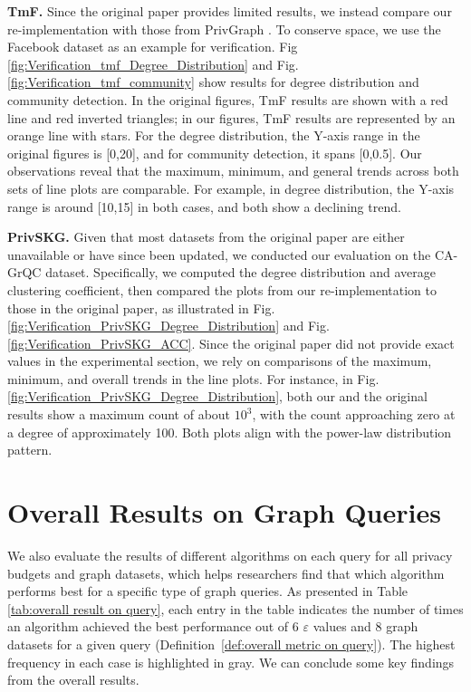 \documentclass[conference]{IEEEtran}
\theoremstyle{plain}
\begin{document}
\textbf{TmF.} 
Since the original paper \cite{nguyen2015differentially} provides limited results, we instead compare our re-implementation with those from PrivGraph \cite{yuan2023privgraph}. 
To conserve space, we use the Facebook dataset as an example for verification. 
Fig \ref{fig:Verification_tmf_Degree_Distribution} and Fig. \ref{fig:Verification_tmf_community} show results for degree distribution and community detection. 
In the original figures, TmF results are shown with a red line and red inverted triangles; in our figures, TmF results are represented by an orange line with stars.
For the degree distribution, the Y-axis range in the original figures is [0,20], and for community detection, it spans [0,0.5]. 
Our observations reveal that the maximum, minimum, and general trends across both sets of line plots are comparable. 
For example, in degree distribution, the Y-axis range is around [10,15] in both cases, and both show a declining trend.

\textbf{PrivSKG.} 
Given that most datasets from the original paper are either unavailable or have since been updated, we conducted our evaluation on the CA-GrQC dataset. 
Specifically, we computed the degree distribution and average clustering coefficient, then compared the plots from our re-implementation to those in the original paper, as illustrated in Fig. \ref{fig:Verification_PrivSKG_Degree_Distribution} and Fig. \ref{fig:Verification_PrivSKG_ACC}.
Since the original paper did not provide exact values in the experimental section, we rely on comparisons of the maximum, minimum, and overall trends in the line plots. 
For instance, in Fig. \ref{fig:Verification_PrivSKG_Degree_Distribution}, both our and the original results show a maximum count of about $10^3$, with the count approaching zero at a degree of approximately 100. 
Both plots align with the power-law distribution pattern.


\section{Overall Results on Graph Queries}

We also evaluate the results of different algorithms on each query for all privacy budgets and graph datasets, which helps researchers find that which algorithm performs best for a specific type of graph queries.
As presented in Table \ref{tab:overall result on query}, each entry in the table indicates the number of times an algorithm achieved the best performance out of 6 $\varepsilon$ values and 8 graph datasets for a given query (Definition~\ref{def:overall metric on query}). 
The highest frequency in each case is highlighted in gray.
We can conclude some key findings from the overall results.
\end{document}
